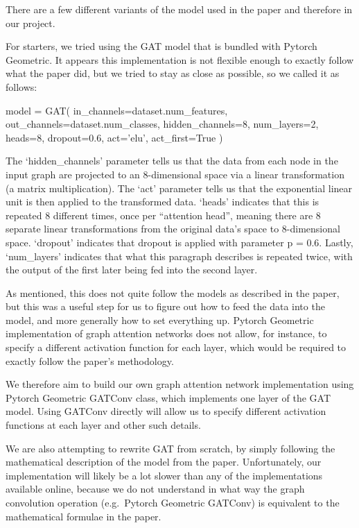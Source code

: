 There are a few different variants of the model used in the paper and
therefore in our project.

For starters, we tried using the GAT model that is bundled with Pytorch
Geometric.
It appears this implementation is not flexible enough to exactly
follow what the paper did, but we tried to stay as close as possible, so we
called it as follows:
\begin{python}
    model = GAT(
    in\_channels=dataset.num\_features,
    out\_channels=dataset.num\_classes,
    hidden\_channels=8,
    num\_layers=2,
    heads=8,
    dropout=0.6,
    act='elu',
    act\_first=True
    )
\end{python}

The `hidden\_channels' parameter tells us that the data from each node in the
input graph are projected to an 8-dimensional space via a linear
transformation (a matrix multiplication).
The `act' parameter tells us that
the exponential linear unit is then applied to the transformed data.
`heads' indicates that this is repeated 8 different times, once per ``attention head'',
meaning there are 8 separate linear transformations from the original data's
space to 8-dimensional space.
`dropout' indicates that dropout is applied with
parameter p = 0.6. Lastly, `num\_layers' indicates that what this paragraph
describes is repeated twice, with the output of the first later being fed into
the second layer.

As mentioned, this does not quite follow the models as described in the paper,
but this was a useful step for us to figure out how to feed the data into the
model, and more generally how to set everything up.
Pytorch Geometric implementation of graph attention networks does not allow, for instance, to
specify a different activation function for each layer, which would be
required to exactly follow the paper's methodology.

We therefore aim to build our own graph attention network implementation using
Pytorch Geometric GATConv class, which implements one layer of the GAT
model.
Using GATConv directly will allow us to specify different activation
functions at each layer and other such details.

We are also attempting to rewrite GAT from scratch, by simply following the
mathematical description of the model from the paper.
Unfortunately, our implementation will likely be a lot slower than any of the implementations
available online, because we do not understand in what way the graph
convolution operation (e.g.\ Pytorch Geometric GATConv) is equivalent to the
mathematical formulae in the paper.
